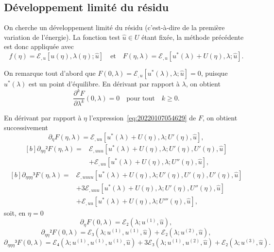 \documentclass[12pt, final]{scrartcl}
\theoremstyle{definition}
\newcommand{\order}[2][1]{#2^{(#1)}}
\begin{document}
\subsection{Développement limité du résidu}
\label{sec:20211112182000}
%

On cherche un développement limité du résidu (c'est-à-dire de la première
variation de l'énergie). La fonction test \(\hat{u} ∈ U\) étant fixée, la
méthode précédente est donc appliquée avec
\begin{equation}
  \label{eq:20220107054629}
  f(η) = ℰ_{, u} [u(η), λ(η); \hat{u}]
  \quad \text{et} \quad
  F(η, λ) = ℰ_{, u}[u^{\ast}(λ) + U(η), λ; \hat{u}].
\end{equation}

On remarque tout d'abord que
\(F(0, λ) =ℰ_{, u} [u^{\ast} (λ), λ; \hat{u}] = 0\), puisque \(u^{\ast}(λ)\) est
un point d'équilibre. En dérivant par rapport à \(λ\), on obtient
\begin{equation*}
  \frac{∂^k F}{∂ λ^k}(0, λ) = 0 \quad \text{pour tout} \quad k ≥ 0.
\end{equation*}

En dérivant par rapport à \(η\) l'expression~\eqref{eq:20220107054629} de \(F\),
on obtient successivement
\begin{equation*}
  ∂_{η}F(η, λ) = ℰ_{, u u}[u^{\ast}(λ) + U(η), λ; U'(η), \hat{u}],
\end{equation*}
\begin{equation*}
  \begin{aligned}[b]
    ∂_{η η}² F(η, λ) ={}
    & ℰ_{, uuu}[u^{\ast}(λ) + U(η), λ; U'(η), U'(η), \hat{u}]\\
    & + ℰ_{, uu} [u^{\ast}(λ) + U(η), λ; U''(η), \hat{u}],
  \end{aligned}
\end{equation*}
\begin{equation*}
  \begin{aligned}[b]
    ∂_{ηηη}³ F(η, λ) ={}
    & ℰ_{, uuuu}[u^{\ast}(λ) + U(η), λ; U'(η), U'(η), U'(η), \hat{u}]\\
    & + 3ℰ_{, u u u}[u^{\ast}(λ) + U(η), λ; U'(η), U''(η), \hat{u}]\\
    & + ℰ_{, uu}[u^{\ast}(λ) + U(η), λ; U'''(η), \hat{u}],
  \end{aligned}
\end{equation*}
soit, en \(η = 0\)
\[∂_{η}F(0, λ) = ℰ₂(λ; \order[1]u, \hat{u}),\]
\[∂_{ηη}² F(0, λ) = ℰ₃(λ; \order[1]u, \order[1]u, \hat{u}) + ℰ₂(λ; \order[2]u, \hat{u}),\]
\[∂_{ηηη}³ F(0, λ) = ℰ₄(λ; \order[1]u, \order[1]u, \order[1]u, \hat{u}) + 3ℰ₃(λ; \order[1]u, \order[2]u, \hat{u}) + ℰ₂(λ; \order[3]u, \hat{u}).\]
\end{document}
